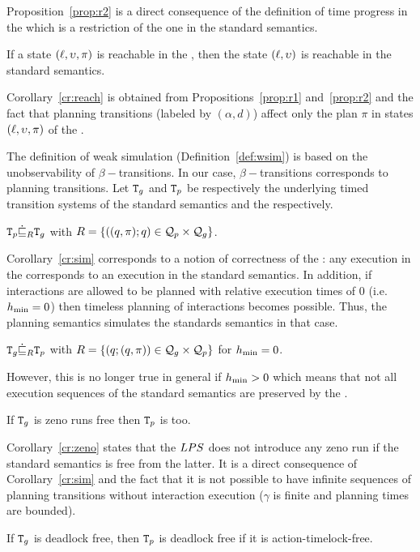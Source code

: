 Proposition~\ref{prop:r2} is a direct consequence of the definition of time progress in 
the \lps which is a restriction of the one in the standard semantics.

\begin{corollary}\label{cr:reach}
If a state $(\ell,\upsilon,\pi)$ is reachable in the \lpsb, then the state $(\ell,\upsilon)$ is 
  reachable in the standard semantics.
\end{corollary}

Corollary~\ref{cr:reach} is obtained from Propositions~\ref{prop:r1} and~\ref{prop:r2} and the 
fact that planning transitions (labeled by $(\alpha,d)$) affect only the plan $\pi$ in 
states $(\ell,\upsilon,\pi)$ of the \lpsabr.

The definition of weak simulation (Definition~\ref{def:wsim})
is based on the unobservability of $\beta-$transitions. 
In our case, $\beta-$transitions corresponds to planning transitions.
Let $\texttt{T}_g$ and $\texttt{T}_p$ be respectively the underlying timed transition systems of the standard
semantics and the \lps respectively.
\begin{corollary}\label{cr:sim}
  $\texttt{T}_p\dot{\sqsubseteq}_{R} \texttt{T}_g$ with $R=\{((q,\pi);q)\in\mathcal{Q}_p\times\mathcal{Q}_g\}$.
\end{corollary}

Corollary~\ref{cr:sim} corresponds to a notion of correctness of the \lpsb: any execution in 
the \lpsabrb corresponds to an execution in the standard semantics.
In addition, if interactions are allowed to be planned with relative execution times of $0$ 
(i.e. $h_{\min} = 0$) then timeless planning of interactions becomes possible. Thus, the planning 
semantics simulates the standards semantics in that case.
\begin{corollary}
  $\texttt{T}_g\dot{\sqsubseteq}_{R} \texttt{T}_p$ with $R=\{(q;(q,\pi))\in\mathcal{Q}_g\times\mathcal{Q}_p\}$ for $h_{\min}=0$.
\end{corollary}

However, this is no longer true in general if  $h_{\min} > 0$ which means that not all execution 
sequences of the standard semantics are preserved by the \lpsb.

\begin{corollary}\label{cr:zeno}
  If $\texttt{T}_g$ is zeno runs free then $\texttt{T}_p$ is too.
\end{corollary}
Corollary~\ref{cr:zeno} states that the $LPS$ does not introduce any zeno run if
the standard semantics is free from the latter. It is a direct consequence of 
Corollary~\ref{cr:sim} and the fact that it is not possible to have infinite sequences of 
planning transitions without interaction execution ($\gamma$ is finite and planning times are
bounded).
\begin{proposition}\label{prop:deadlock-timelock}
If $\texttt{T}_g$ is deadlock free, then $\texttt{T}_p$ is deadlock free if it is action-timelock-free.
  
\end{proposition}

